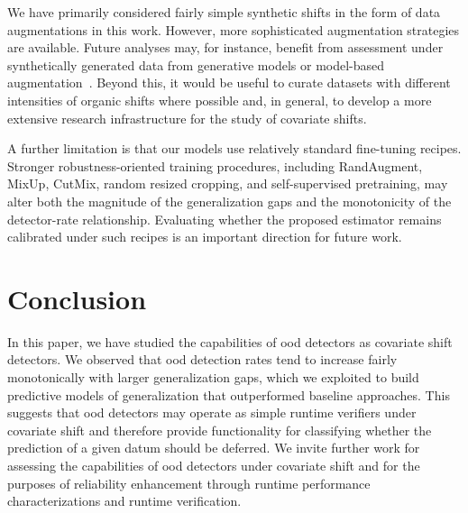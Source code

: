 \documentclass[10pt,twocolumn,letterpaper]{article}
\begin{document}
We have primarily considered fairly simple synthetic shifts in the form of data augmentations in this work. However, more sophisticated augmentation strategies are available. Future analyses may, for instance, benefit from assessment under synthetically generated data from generative models or model-based augmentation~\cite{deepaugment}. Beyond this, it would be useful to curate datasets with different intensities of organic shifts where possible and, in general, to develop a more extensive research infrastructure for the study of covariate shifts. 

A further limitation is that our models use relatively standard fine-tuning recipes. Stronger robustness-oriented training procedures, including RandAugment, MixUp, CutMix, random resized cropping, and self-supervised pretraining, may alter both the magnitude of the generalization gaps and the monotonicity of the detector-rate relationship. Evaluating whether the proposed estimator remains calibrated under such recipes is an important direction for future work.

\section{Conclusion}\label{sec:conclusion}
In this paper, we have studied the capabilities of \gls{ood} detectors as covariate shift detectors. We observed that \gls{ood} detection rates tend to increase fairly monotonically with larger generalization gaps, which we exploited to build predictive models of generalization that outperformed baseline approaches. This suggests that \gls{ood} detectors may operate as simple runtime verifiers under covariate shift and therefore provide functionality for classifying whether the prediction of a given datum should be deferred. We invite further work for assessing the capabilities of \gls{ood} detectors under covariate shift and for the purposes of reliability enhancement through runtime performance characterizations and runtime verification.

{\small


}
\end{document}
